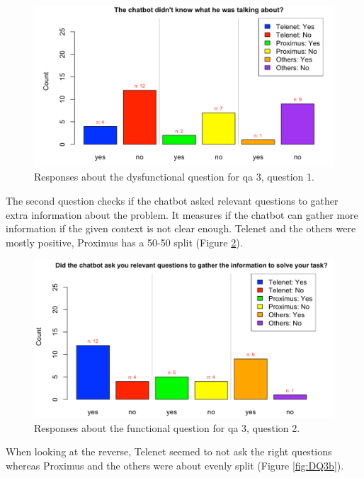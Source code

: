 \begin{figure}[!htb]
	\includegraphics[width=\linewidth, scale=0.5]{../LaTeX/Figures/Comparative/DQ3.png}
	\caption{Responses about the dysfunctional question for \acrshort{qa} 3, question 1.}\label{fig:DQ3}
\end{figure}
\break
The second question checks if the chatbot asked relevant questions to gather extra information about the problem. It measures if the chatbot can gather more information if the given context is not clear enough. Telenet and the others were mostly positive, Proximus has a 50-50 split (Figure \ref{fig:Q3b}).\\
\begin{figure}[!htb]
	\includegraphics[width=\linewidth, scale=0.5]{../LaTeX/Figures/Comparative/Q3b.png}
	\caption{Responses about the functional question for \acrshort{qa} 3, question 2.}\label{fig:Q3b}
\end{figure}
When looking at the reverse, Telenet seemed to not ask the right questions whereas Proximus and the others were about evenly split (Figure \ref{fig:DQ3b}).\\
